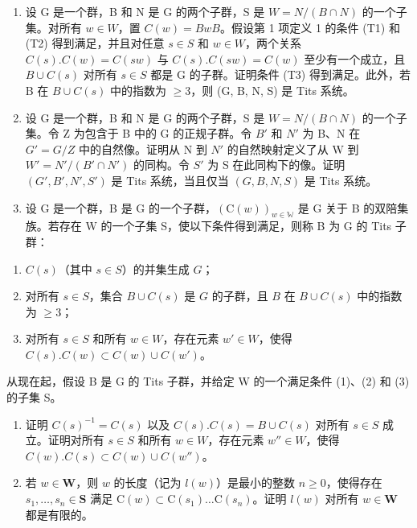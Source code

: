 
\begin{enumerate}
\def\labelenumi{\arabic{enumi})}
\item
  设 G 是一个群，B 和 N 是 G 的两个子群，S 是 \(W = N/(B \cap N)\) 的一个子集。对所有 \(w \in W\)，置 \(C(w) = BwB\)。假设第 1 项定义 1 的条件 (T1) 和 (T2) 得到满足，并且对任意 \(s \in S\) 和 \(w \in W\)，两个关系 \(C(s).C(w) = C(sw)\) 与 \(C(s).C(sw) = C(w)\) 至少有一个成立，且 \(B \cup C(s)\) 对所有 \(s \in S\) 都是 G 的子群。证明条件 (T3) 得到满足。此外，若 B 在 \(B \cup C(s)\) 中的指数为 \(\geqslant 3\)，则 (G, B, N, S) 是 Tits 系统。
\item
  设 G 是一个群，B 和 N 是 G 的两个子群，S 是 \(W = N/(B \cap N)\) 的一个子集。令 Z 为包含于 B 中的 G 的正规子群。令 \(B'\) 和 \(N'\) 为 B、N 在 \(G' = G/Z\) 中的自然像。证明从 N 到 \(N'\) 的自然映射定义了从 W 到 \(W' = N'/(B' \cap N')\) 的同构。令 \(S'\) 为 S 在此同构下的像。证明 \((G', B', N', S')\) 是 Tits 系统，当且仅当 \((G, B, N, S)\) 是 Tits 系统。
\item
  设 G 是一个群，B 是 G 的一个子群，\((\mathrm{C}(w))_{w\in\mathbb{W}}\) 是 G 关于 B 的双陪集族。若存在 W 的一个子集 S，使以下条件得到满足，则称 B 为 G 的 Tits 子群：
\end{enumerate}

\begin{enumerate}
\def\labelenumi{(\arabic{enumi})}
\item
  \(C(s)\)（其中 \(s \in S\)）的并集生成 \(G\)；
\item
  对所有 \(s \in S\)，集合 \(B \cup C(s)\) 是 \(G\) 的子群，且 \(B\) 在 \(B \cup C(s)\) 中的指数为 \(\geqslant 3\)；
\item
  对所有 \(s \in S\) 和所有 \(w \in W\)，存在元素 \(w' \in W\)，使得 \(C(s).C(w) \subset C(w) \cup C(w')\)。
\end{enumerate}

从现在起，假设 B 是 G 的 Tits 子群，并给定 W 的一个满足条件 (1)、(2) 和 (3) 的子集 S。

\begin{enumerate}
\def\labelenumi{\alph{enumi})}
\item
  证明 \(C(s)^{-1} = C(s)\) 以及 \(C(s).C(s) = B \cup C(s)\) 对所有 \(s \in S\) 成立。证明对所有 \(s \in S\) 和所有 \(w \in W\)，存在元素 \(w'' \in W\)，使得 \(C(w).C(s) \subset C(w) \cup C(w'')\)。
\item
  若 \(w \in \mathbf{W}\)，则 \(w\) 的长度（记为 \(l(w)\)）是最小的整数 \(n \geqslant 0\)，使得存在 \(s_1, \ldots, s_n \in \mathbf{S}\) 满足 \(\mathrm{C}(w) \subset \mathrm{C}(s_1) \ldots \mathrm{C}(s_n)\)。证明 \(l(w)\) 对所有 \(w \in \mathbf{W}\) 都是有限的。
\end{enumerate}

